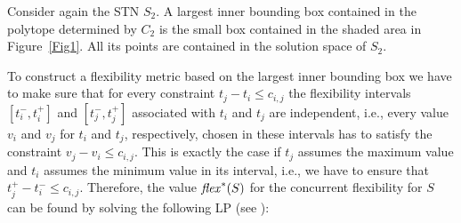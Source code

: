\begin{example}
Consider again the STN $S_2$. A largest inner bounding box contained in the polytope determined by $C_2$ is the small box contained in the shaded area in Figure~\ref{Fig1}. All its points are contained in the solution space of $S_2$.
\end{example} 
To construct a flexibility metric based on the largest inner bounding box we have to make sure that for every constraint $t_j - t_i \leq c_{i,j}$  the flexibility intervals  $[t^-_i, t^+_i]$ and $[t^-_j, t^+_j]$ associated with $t_i$ and $t_j$ are independent, i.e., every value $v_i$ and $v_j$ for $t_i$ and $t_j$, respectively, chosen in these intervals has to satisfy the constraint $v_j - v_i \leq c_{i,j}$. 
This is exactly the case if $t_j$ assumes the maximum value and $t_i$ assumes the minimum value in its interval, i.e., we have to ensure that $t^+_j - t^-_i \leq c_{i,j}$.
Therefore, the value $\mathit{flex}^*(S)$ for the concurrent flexibility for $S$ can be found by solving the following LP (see \cite{wilson:2014}):
%
%

